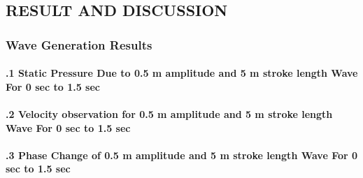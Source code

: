 \documentclass{article}
\begin{document}
\subsection*{\centering\fontsize{12}{14}\selectfont RESULT AND DISCUSSION}

\subsubsection*{\fontsize{10}{12} Wave Generation Results}

\paragraph{\fontsize{10}{12}.1 Static Pressure Due to 0.5 m amplitude and 5 m stroke length Wave For 0 sec to 1.5 sec}


\paragraph{\fontsize{10}{12}.2 Velocity observation for 0.5 m amplitude and 5 m stroke length Wave For 0 sec to 1.5 sec}


\paragraph{\fontsize{10}{12}.3 Phase Change of 0.5 m amplitude and 5 m stroke length Wave For 0 sec to 1.5 sec}


\end{document}
